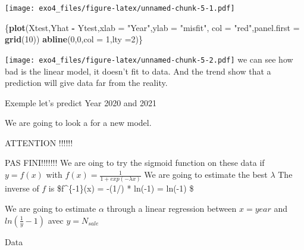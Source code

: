 \documentclass[
]{article}
\newenvironment{Shaded}{\begin{snugshade}}{\end{snugshade}}
\newcommand{\DataTypeTok}[1]{\textcolor[rgb]{0.13,0.29,0.53}{#1}}
\newcommand{\DecValTok}[1]{\textcolor[rgb]{0.00,0.00,0.81}{#1}}
\newcommand{\KeywordTok}[1]{\textcolor[rgb]{0.13,0.29,0.53}{\textbf{#1}}}
\newcommand{\NormalTok}[1]{#1}
\newcommand{\OperatorTok}[1]{\textcolor[rgb]{0.81,0.36,0.00}{\textbf{#1}}}
\newcommand{\StringTok}[1]{\textcolor[rgb]{0.31,0.60,0.02}{#1}}
\begin{document}
\texttt{[image: exo4\_files/figure-latex/unnamed-chunk-5-1.pdf]}

\begin{Shaded}
\begin{Highlighting}[]
\NormalTok{\{}\KeywordTok{plot}\NormalTok{(Xtest,Yhat }\OperatorTok{-}\StringTok{ }\NormalTok{Ytest,}\DataTypeTok{xlab =} \StringTok{"Year"}\NormalTok{,}\DataTypeTok{ylab =} \StringTok{"misfit"}\NormalTok{, }\DataTypeTok{col =} \StringTok{"red"}\NormalTok{,}\DataTypeTok{panel.first =} \KeywordTok{grid}\NormalTok{(}\DecValTok{10}\NormalTok{))}
\KeywordTok{abline}\NormalTok{(}\DecValTok{0}\NormalTok{,}\DecValTok{0}\NormalTok{,}\DataTypeTok{col =} \DecValTok{1}\NormalTok{,}\DataTypeTok{lty =}\DecValTok{2}\NormalTok{)\}}
\end{Highlighting}
\end{Shaded}

\texttt{[image: exo4\_files/figure-latex/unnamed-chunk-5-2.pdf]} we can
see how bad is the linear model, it doesn't fit to data. And the trend
show that a prediction will give data far from the reality.

Exemple let's predict Year 2020 and 2021

\begin{Shaded}
\end{Shaded}

We are going to look a for a new model.

ATTENTION !!!!!!

PAS FINI!!!!!!! We are oing to try the sigmoid function on these data if
\(y = f(x)\) with \(f(x) = \frac{1}{1+exp(-\lambda x)}\) We are going to
estimate the best \(\lambda\) The inverse of \(f\) is \$f\^{}\{-1\}(x) =
-(1/\lambda) * ln(-1) = \alpha * ln(-1) \$

We are going to estimate \(\alpha\) through a linear regression between
\(x = year\) and \(ln(\frac{1}{y}-1)\) avec \(y = N_{sale}\)

Data
\end{document}

